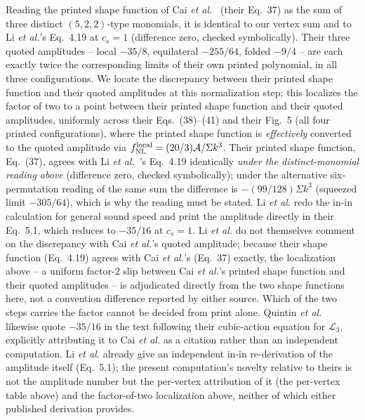 \documentclass[aps,prd,twocolumn,superscriptaddress,nofootinbib,longbibliography]{revtex4-2}
\newcommand{\fnlloc}{f_{\rm NL}^{\rm local}}
\begin{document}
Reading the printed shape function of Cai \textit{et al.}~\cite{Cai2009} (their
Eq.~37) as the sum of three distinct $(5,2,2)$-type monomials, it is identical to
our vertex sum and to Li \textit{et al.}'s Eq.~4.19 at $c_s=1$ (difference zero,
checked symbolically). Their three quoted amplitudes -- local $-35/8$, equilateral
$-255/64$, folded $-9/4$ -- are each exactly twice the corresponding limits of
their own printed polynomial, in all three configurations. We locate the
discrepancy between their printed shape function and their quoted amplitudes at
this normalization step; this localizes the factor of two to a point
between their printed shape function and their quoted amplitudes,
uniformly across their Eqs.~(38)--(41) and their Fig.~5 (all
four printed configurations), where the printed shape function is
\emph{effectively} converted to the quoted amplitude via
$\fnlloc=(20/3)\mathcal{A}/\Sigma k^3$. Their printed shape
function, Eq.~(37), agrees with Li \textit{et al.}~\cite{Li2016}'s Eq.~4.19
identically \emph{under the distinct-monomial reading above} (difference
zero, checked symbolically); under the alternative six-permutation reading
of the same sum the difference is $-(99/128)\Sigma k^3$ (squeezed limit
$-305/64$), which is why the reading must be stated. Li \textit{et al.}
redo the in-in calculation for general sound speed and print the amplitude
directly in their Eq.~5.1, which reduces to $-35/16$ at $c_s=1$. Li
\textit{et al.} do not themselves comment on the discrepancy with Cai
\textit{et al.}'s quoted amplitude; because their shape function (Eq.~4.19)
agrees with Cai \textit{et al.}'s (Eq.~37) exactly, the localization above --
a uniform factor-$2$ slip between Cai \textit{et al.}'s printed shape
function and their quoted amplitudes -- is adjudicated directly from the
two shape functions here, not a convention difference
reported by either source. Which of the two steps carries the factor
cannot be decided from print alone. Quintin \textit{et al.}~\cite{Quintin2015}
likewise quote $-35/16$ in the text following their cubic-action equation
for $\mathcal L_3$, explicitly attributing it to Cai \textit{et al.} as a
citation rather than an independent computation. Li \textit{et al.} already
give an independent in-in re-derivation of the amplitude itself (Eq.~5.1);
the present computation's novelty relative to theirs is not the amplitude
number but the per-vertex attribution of it (the per-vertex table above) and
the factor-of-two localization above,
neither of which either published derivation provides.
\end{document}
